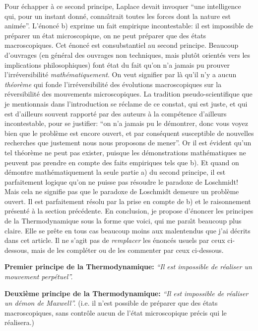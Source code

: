 Pour \'echapper \`a ce second principe, Laplace devait invoquer ``une
intelligence qui, pour un instant donn\'e, conna{\^\i}trait toutes les 
forces dont la nature est anim\'ee''. 
\medskip 
L'\'enonc\'e b) exprime un fait empirique 
incontestable: il est impossible de pr\'eparer un \'etat microscopique, 
on ne peut pr\'eparer que des \'etats macroscopiques. Cet \'enonc\'e est 
consubstantiel au second principe. 
\medskip 
Beaucoup d'ouvrages (en g\'en\'eral des ouvrages non techniques, mais 
plut\^ot orient\'es vers les implications philosophiques) font \'etat 
du fait qu'on n'a jamais pu prouver l'irr\'eversibilit\'e {\it 
math\'ematiquement}. On veut signifier par l\`a qu'il n'y a aucun 
{\it th\'eor\`eme} qui fonde l'irr\'eversibilit\'e des \'evolutions 
macroscopiques sur la r\'eversibilit\'e des mouvements microscopiques. 
La tradition pseudo-scientifique que je mentionnais dans l'introduction 
se r\'eclame de ce constat, qui est juste, et qui est d'ailleurs souvent
rapport\'e par des auteurs \`a la comp\'etence d'ailleurs incontestable, 
pour se justifier: ``on n'a jamais pu le 
d\'emontrer, donc vous voyez bien que le probl\`eme est encore ouvert, 
et par cons\'equent susceptible de nouvelles recherches que justement 
nous nous proposons de mener''. Or il est \'evident qu'un tel th\'eor\`eme 
ne peut pas exister, puisque les d\'emonstrations math\'ematiques ne 
peuvent pas prendre en compte des faits empiriques tels que b). Et 
quand on d\'emontre math\'ematiquement la seule partie a) du second 
principe, il est parfaitement logique qu'on ne puisse pas r\'esoudre 
le paradoxe de Loschmidt! Mais cela ne signifie pas que le paradoxe de 
Loschmidt demeure un probl\`eme ouvert. 
Il est parfaitement r\'esolu par la prise en compte de b) et le 
raisonnement pr\'esent\'e \`a la section pr\'ec\'edente.
\medskip 
En conclusion, je propose d'\'enoncer les principes de la Thermodynamique 
sous la forme que voici, qui me para{\^\i}t beaucoup plus claire. Elle 
se pr\^ete en tous cas beaucoup moins aux malentendus que j'ai d\'ecrits 
dans cet article. Il ne s'agit pas de {\it remplacer} les \'enonc\'es usuels 
par ceux ci-dessous, mais de les compl\'eter ou de les commenter par 
ceux ci-dessous.

\vfill
\centerline{\vbox{\hsize=11cm 
{\bf Premier principe de la Thermodynamique:}
\smallskip
{\sl
``Il est impossible de r\'ealiser un mouvement perp\'etuel''.} } }
\vfill
\centerline{\vbox{\hsize=11cm 
{\bf Deuxi\`eme principe de la Thermodynamique:}
\smallskip
{\sl
``Il est impossible de r\'ealiser un d\'emon de Maxwell''.}
\medskip
(i.e. il n'est possible de pr\'eparer que des \'etats macroscopiques, sans 
contr\^ole aucun de l'\'etat microscopique pr\'ecis qui le r\'ealisera.) } }
\vfill \vfill \break

